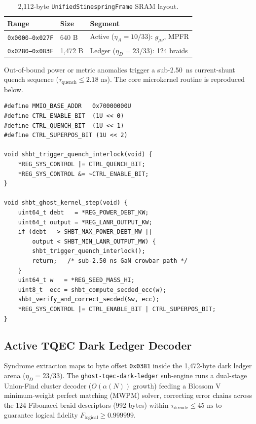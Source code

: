 \documentclass[twocolumn,aps,pra,floatfix,superscriptaddress,10pt]{revtex4-2}
\begin{document}
\begin{table}[!ht]
\caption{\label{tab:sram}2,112-byte \texttt{UnifiedStinespringFrame} SRAM layout.}
\begin{ruledtabular}
\scriptsize
\begin{tabular}{lll}
Range & Size & Segment \\
\hline
\texttt{0x0000--0x027F} & 640 B & Active ($\eta_A{=}10/33$): $g_{\mu\nu}$, MPFR \\
\texttt{0x0280--0x083F} & 1{,}472 B & Ledger ($\eta_D{=}23/33$): 124 braids \\
\end{tabular}
\end{ruledtabular}
\end{table}

Out-of-bound power or metric anomalies trigger a sub-2.50~ns current-shunt quench sequence ($\tau_{\text{quench}} \le 2.18\text{ ns}$). The core microkernel routine is reproduced below.

\begin{lstlisting}[style=kernelc,caption={C11 microkernel step routine (excerpt).},label={lst:kernel}]
#define MMIO_BASE_ADDR   0x70000000U
#define CTRL_ENABLE_BIT  (1U << 0)
#define CTRL_QUENCH_BIT  (1U << 1)
#define CTRL_SUPERPOS_BIT (1U << 2)

void shbt_trigger_quench_interlock(void) {
    *REG_SYS_CONTROL |= CTRL_QUENCH_BIT;
    *REG_SYS_CONTROL &= ~CTRL_ENABLE_BIT;
}

void shbt_ghost_kernel_step(void) {
    uint64_t debt   = *REG_POWER_DEBT_KW;
    uint64_t output = *REG_LANR_OUTPUT_KW;
    if (debt   > SHBT_MAX_POWER_DEBT_MW ||
        output < SHBT_MIN_LANR_OUTPUT_MW) {
        shbt_trigger_quench_interlock();
        return;   /* sub-2.50 ns GaN crowbar path */
    }
    uint64_t w   = *REG_SEED_MASS_HI;
    uint8_t  ecc = shbt_compute_secded_ecc(w);
    shbt_verify_and_correct_secded(&w, ecc);
    *REG_SYS_CONTROL |= CTRL_ENABLE_BIT | CTRL_SUPERPOS_BIT;
}
\end{lstlisting}

\subsection{Active TQEC Dark Ledger Decoder}

Syndrome extraction maps to byte offset \texttt{0x0381} inside the 1,472-byte dark ledger arena ($\eta_D = 23/33$). The \texttt{ghost-tqec-dark-ledger} sub-engine runs a dual-stage Union-Find cluster decoder ($O(\alpha(N))$ growth) feeding a Blossom V minimum-weight perfect matching (MWPM) solver, correcting error chains across the 124 Fibonacci braid descriptors (992 bytes) within $\tau_{\text{decode}} \le 45\text{ ns}$ to guarantee logical fidelity $F_{\text{logical}} \ge 0.999999$.
\end{document}
